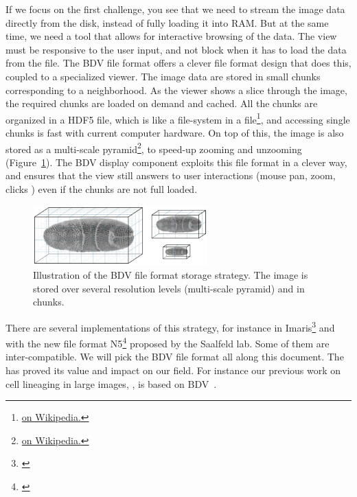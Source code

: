 If we focus on the first challenge, you see that we need to stream the image data directly from the disk, instead of fully loading it into RAM. 
But at the same time, we need a tool that allows for interactive browsing of the data. 
The view must be responsive to the user input, and not block when it has to load the data from the file. 
The BDV file format offers a clever file format design that does this, coupled to a specialized viewer.
The image data are stored in small chunks corresponding to a neighborhood. As the viewer shows a slice through the image, the required chunks are loaded on demand and cached.
All the chunks are organized in a HDF5 file, which is like a file-system in a file\footnote{\href{https://en.wikipedia.org/wiki/Hierarchical_Data_Format}{ on Wikipedia.}}, and accessing single chunks is fast with current computer hardware.
On top of this, the image is also stored as a multi-scale pyramid\footnote{\href{https://en.wikipedia.org/wiki/Pyramid_(image_processing)}{ on Wikipedia.}}, to speed-up zooming and unzooming (Figure~\ref{fig:BDVchunks}).
The BDV display component exploits this file format in a clever way, and ensures that the view still answers to user interactions (mouse pan, zoom, clicks \etc) even if the chunks are not full loaded.

\begin{figure}
    \centering
    \includegraphics[width=0.6\textwidth]{figures/BdvTikz-pyramidblocks.png}
    \caption{Illustration of the BDV file format storage strategy. The image is stored over several resolution levels (multi-scale pyramid) and in chunks.}
    \label{fig:BDVchunks}
\end{figure}

There are several implementations of this strategy, for instance in Imaris\footnote{\href{http://open.bitplane.com/Default.aspx?tabid=268}{}} and with the new file format N5\footnote{\href{https://github.com/saalfeldlab/n5}{}} proposed by the Saalfeld lab.
Some of them are inter-compatible.
We will pick the BDV file format all along this document. 
The \Bdv has proved its value and impact on our field.
For instance our previous work on cell lineaging in large images, , is based on BDV~\cite{MaMuT}.



